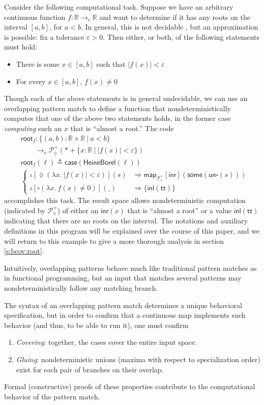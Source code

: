 \documentclass[conference]{IEEEtran}
\newcommand{\PLower}{\mathcal{P}_\lozenge}
\newcommand{\cto}{\to_c}
\newcommand{\R}{\mathbb{R}}
\newcommand{\map}[2]{\mathsf{map}_{#1}[{#2}]}
\newcommand{\fun}[2]{\lambda {#1}.\  {#2}}
\newcommand{\suchthat}{\ |\ }
\newcommand{\One}{\ast}
\newcommand{\wildcard}{\_}
\newcommand{\oinclf}[1]{\iota[{#1}]}
\newcommand{\oincl}[2]{\oinclf{#1} \left({#2}\right)}
\newcommand{\Branch}{\Rightarrow}
\newcommand{\RootFindingCode}{
&\mathsf{root}_f : \{ (a, b) : \R \times \R \suchthat a < b \}
  \\ &\qquad \cto \PLower^+(\One + \{ x : \R \suchthat |f(x)| < \varepsilon \})
\\ &\mathsf{root}_f(\ell) \triangleq \mathsf{case}(\mathsf{HeineBorel}(\ell))
\\ &\begin{cases}
\oincl{\lozenge (\fun{x}{|f(x)| < \varepsilon})}{s} 
  &\Branch \map{\PLower^+}{\mathsf{inr}}(\mathsf{some}(\mathsf{un}\square(s)))
\\ \oincl{\square (\fun{x}{f(x) \neq 0})}{\wildcard}
  &\Branch \{ \mathsf{inl}(\mathsf{tt}) \}
\end{cases}
}
\newcommand{\grammar}[1]{\textcolor{red}{\underline{#1}}}
\renewcommand{\grammar}[1]{#1}
\begin{document}
Consider the following computational task. Suppose we have an arbitrary continuous function $f : \R \cto \R$ and want to determine if it has any roots on the interval $[a,b]$, for $a < b$. In general, \grammar{this} is not decidable \cite{lamcra}, but an approximation is possible: fix a tolerance $\varepsilon > 0$. Then either, or both, of the following statements must hold:
\begin{itemize}
\item There is some $x \in [a, b]$ such that $|f(x)| < \varepsilon$
\item For every $x \in [a, b]$, $f(x) \neq 0$
\end{itemize}
Though each of the above statements is in general undecidable, we can use an overlapping pattern match to define a function that nondeterministically computes that one of the above two statements holds, in the former case \emph{computing} such an $x$ that is ``almost a root.'' The code
\begin{align*}
\RootFindingCode
\end{align*}
accomplishes this task.
The result space allows nondeterministic computation (indicated by $\PLower^+$) of either an $\mathsf{inr}(x)$ that is ``almost a root'' or a value $\mathsf{inl}(\mathsf{tt})$ indicating that there are no roots on the interval.
The notations and auxiliary definitions in this program will be explained over the course of this paper, and we will return to this example to give a more thorough analysis in section \ref{s:bcov:root}.
 
Intuitively, overlapping patterns behave much like traditional pattern matches as in functional programming, but an input that matches several patterns may nondeterministically follow any matching branch.

The syntax of an overlapping pattern match determines a unique behavioral specification, but in order to confirm that a continuous map implements such behavior (and thus, to be able to run it), one must confirm
\begin{enumerate}
\item \emph{Covering}: together, the cases cover the entire input space.
\item \emph{Gluing}: nondeterministic unions (maxima with respect to specialization order) exist for each pair of branches on their overlap.
\end{enumerate}
Formal (constructive) proofs of these properties contribute to the computational behavior of the pattern match.
\end{document}
